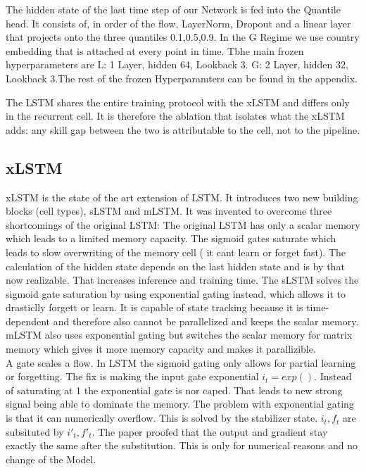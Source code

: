 The hidden state of the last time step of our Network is fed into the Quantile head. It consists of, in order of the flow, LayerNorm, Dropout and a linear layer that projects onto the three quantiles {0.1,0.5,0.9}. In the G Regime we use country embedding that is attached at every point in time. Tbhe main frozen hyperparameters are L: 1 Layer, hidden 64, Lookback 3. G: 2 Layer, hidden 32, Lookback 3.The rest of the frozen Hyperparamters can be found in the appendix. %

The LSTM shares the entire training protocol with the xLSTM and differs only in the recurrent cell. It is therefore the ablation that isolates what the xLSTM adds: any skill gap between the two is attributable to the cell, not to the pipeline.



\subsection{xLSTM}

\label{sec:models:xlstm}

xLSTM is the state of the art extension of LSTM. It introduces two new building blocks (cell types), sLSTM and mLSTM. It was invented to overcome three shortcomings of the original LSTM: The original LSTM has only a scalar memory which leads to a limited memory capacity. The sigmoid gates saturate which leads to slow overwriting of the memory cell ( it cant learn or forget fast). The calculation of the hidden state depends on the last hidden state and is by that now realizable. That increases inference and training time. The sLSTM solves the sigmoid gate saturation by using exponential gating instead, which allows it to drasticlly forgett or learn. It is capable of state tracking because it is time-dependent and therefore also cannot be parallelized and keeps the scalar memory. mLSTM also uses exponential gating but switches the scalar memory for matrix memory which gives it more memory capacity and makes it parallizible. \\


A gate scales a flow. In LSTM the sigmoid gating only allows for partial learning or forgetting. The fix is making the input gate exponential $i_t=exp()$. Instead of saturating at 1 the exponential gate is nor caped. That leads to new strong signal being able to dominate the memory. The problem with exponential gating is that it can numerically overflow. This is solved by the stabilizer state. $i_t,f_t$ are subsituted by $i'_t,f'_t$. The paper proofed that the output and gradient stay exactly the same after the substitution. This is only for numerical reasons and no change of the Model. %

